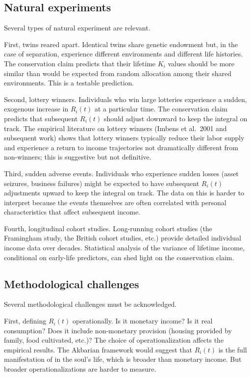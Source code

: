 \subsection{Natural experiments}

Several types of natural experiment are relevant.

First, twins reared apart. Identical twins share genetic endowment
but, in the case of separation, experience different environments
and different life histories. The conservation claim predicts that
their lifetime $K_i$ values should be more similar than would be
expected from random allocation among their shared environments.
This is a testable prediction.

Second, lottery winners. Individuals who win large lotteries
experience a sudden, exogenous increase in $R_i(t)$ at a particular
time. The conservation claim predicts that subsequent $R_i(t)$
should adjust downward to keep the integral on track. The
empirical literature on lottery winners (Imbens et al.\ 2001 and
subsequent work) shows that lottery winners typically reduce their
labor supply and experience a return to income trajectories not
dramatically different from non-winners; this is suggestive but
not definitive.

Third, sudden adverse events. Individuals who experience sudden
losses (asset seizures, business failures) might be expected to
have subsequent $R_i(t)$ adjustments upward to keep the integral on
track. The data on this is harder to interpret because the events
themselves are often correlated with personal characteristics that
affect subsequent income.

Fourth, longitudinal cohort studies. Long-running cohort studies
(the Framingham study, the British cohort studies, etc.) provide
detailed individual income data over decades. Statistical analysis
of the variance of lifetime income, conditional on early-life
predictors, can shed light on the conservation claim.

\subsection{Methodological challenges}

Several methodological challenges must be acknowledged.

First, defining $R_i(t)$ operationally. Is it monetary income? Is it
real consumption? Does it include non-monetary provision (housing
provided by family, food cultivated, etc.)? The choice of
operationalization affects the empirical results. The Akbarian
framework would suggest that $R_i(t)$ is the full manifestation of
 in the soul's life, which is broader than monetary
income. But broader operationalizations are harder to measure.

